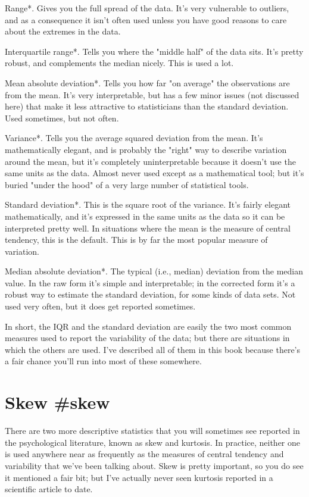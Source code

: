 \item *Range*. Gives you the full spread of the data. It's very vulnerable to outliers, and as a consequence it isn't often used unless you have good reasons to care about the extremes in the data.
\item *Interquartile range*. Tells you where the "middle half" of the data sits. It's pretty robust, and complements the median nicely. This is used a lot.
\item *Mean absolute deviation*. Tells you how far "on average" the observations are from the mean. It's very interpretable, but has a few minor issues (not discussed here) that make it less attractive to statisticians than the standard deviation. Used sometimes, but not often.
\item *Variance*. Tells you the average squared deviation from the mean. It's mathematically elegant, and is probably the "right" way to describe variation around the mean, but it's completely uninterpretable because it doesn't use the same units as the data. Almost never used except as a mathematical tool; but it's buried "under the hood" of a very large number of statistical tools.
\item *Standard deviation*. This is the square root of the variance. It's fairly elegant mathematically, and it's expressed in the same units as the data so it can be interpreted pretty well. In situations where the mean is the measure of central tendency, this is the default. This is by far the most popular measure of variation. 
\item *Median absolute deviation*. The typical (i.e., median) deviation from the median value. In the raw form it's simple and interpretable; in the corrected form it's a robust way to estimate the standard deviation, for some kinds of data sets. Not used very often, but it does get reported sometimes.



In short, the IQR and the standard deviation are easily the two most common measures used to report the variability of the data; but there are situations in which the others are used. I've described all of them in this book because there's a fair chance you'll run into most of these somewhere.

\section{Skew {#skew}}

There are two more descriptive statistics that you will sometimes see reported in the psychological literature, known as skew and kurtosis. In practice, neither one is used anywhere near as frequently as the measures of central tendency and variability that we've been talking about. Skew is pretty important, so you do see it mentioned a fair bit; but I've actually never seen kurtosis reported in a scientific article to date. 


